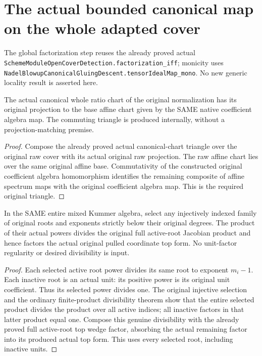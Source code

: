 \section{The actual bounded canonical map on the whole adapted cover}

The global factorization step reuses the already proved actual
\nolinkurl{SchemeModuleOpenCoverDetection.factorization_iff}; monicity uses
\nolinkurl{NadelBlowupCanonicalGluingDescent.tensorIdealMap_mono}.
No new generic locality result is asserted here.

\begin{lemma}
\label{lem:kn-nadel-bounded-original-ratio-projection}
\leanok
{}
The actual canonical whole ratio chart of the original normalization has
its original projection to the base affine chart given by the SAME native
coefficient algebra map. The commuting triangle is produced internally,
without a projection-matching premise.
\end{lemma}
\begin{proof}
Compose the already proved actual canonical-chart triangle over the
original raw cover with its actual original raw projection. The raw affine
chart lies over the same original affine base. Commutativity of the
constructed original coefficient algebra homomorphism identifies the
remaining composite of affine spectrum maps with the original coefficient
algebra map. This is the required original triangle.
\end{proof}

\begin{lemma}
\label{lem:kn-nadel-selected-root-top-factor}
\leanok
{}
In the SAME entire mixed Kummer algebra, select any injectively indexed
family of original roots and exponents strictly below their original degrees.
The product of their actual powers divides the original full active-root
Jacobian product and hence factors the actual original pulled coordinate
top form. No unit-factor regularity or desired divisibility is input.
\end{lemma}
\begin{proof}
Each selected active root power divides its same root to exponent $m_i-1$.
Each inactive root is an actual unit: its positive power is its original
unit coefficient. Thus its selected power divides one. The original
injective selection and the ordinary finite-product divisibility theorem
show that the entire selected product divides the product over all active
indices; all inactive factors in that latter product equal one. Compose
this genuine divisibility with the already proved full active-root top
wedge factor, absorbing the actual remaining factor into its produced
actual top form. This uses every selected root, including inactive units.
\end{proof}

